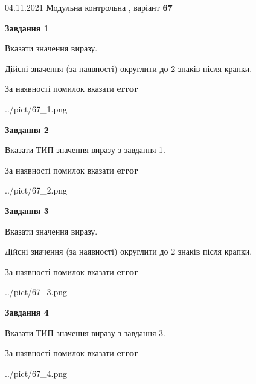 \documentclass[11pt, ukrainian]{article}
\begin{document}
{04.11.2021 Модульна контрольна , варіант  \No \textbf { 67 }\par}
{
\begin {large}
{\begin {center}\textbf{Завдання 1}\end {center}}\par
Вказати значення виразу. \par
Дійсні значення (за наявності) округлити до 2 знаків після крапки. \par
За наявності помилок вказати \textbf{error}

\begin{center}
	{../pict/67_1.png}
\end{center}
\newpage

{\begin {center}\textbf{Завдання 2}\end {center}}\par
Вказати ТИП значення виразу з завдання 1. \par
За наявності помилок вказати \textbf{error}

\begin{center}
	{../pict/67_2.png}
\end{center}
\newpage

{\begin {center}\textbf{Завдання 3}\end {center}}\par
Вказати значення виразу. \par
Дійсні значення (за наявності) округлити до 2 знаків після крапки. \par
За наявності помилок вказати \textbf{error}

\begin{center}
	{../pict/67_3.png}
\end{center}
\newpage

{\begin {center}\textbf{Завдання 4}\end {center}}\par
Вказати ТИП значення виразу з завдання 3. \par
За наявності помилок вказати \textbf{error}

\begin{center}
	{../pict/67_4.png}
\end{center}
\newpage


\end{large}}
\end{document}
